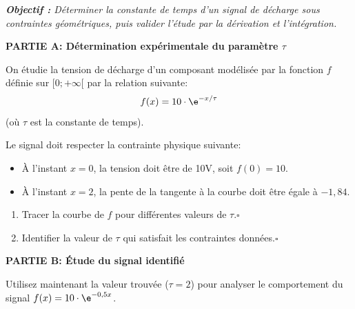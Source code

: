 \documentclass[a4paper,10pt]{report}
\begin{document}
\renewcommand{\labelitemi}{\textbullet}

\pagestyle{DS_FP}
\NomPrenomNote{}


\bigskip

\emph{\textbf{Objectif :} Déterminer la constante de temps d'un signal de décharge sous contraintes géométriques, puis valider l'étude par la dérivation et l'intégration.}

\medskip

\textbf{PARTIE A: Détermination expérimentale du paramètre $\tau$}


\medskip

On étudie la tension de décharge d'un composant modélisée par la fonction $f$ définie sur $[0; +\infty[$ par la relation suivante:
\[f(x) = 10\cdot \e^{-x/\tau}\] (où $\tau$ est la constante de temps).
\medskip

Le signal doit respecter la contrainte physique suivante:

\begin{itemize}
    \item À l'instant $x=0$, la tension doit être de 10V, soit $f(0) = 10$.
    \item À l'instant $x=2$, la pente de la tangente à la courbe doit être égale à $-1,84$.
\end{itemize}

\begin{enumerate}
    \item Tracer la courbe de $f$ pour différentes valeurs de $\tau$.\hfill $\square$
    \item Identifier la valeur de $\tau$ qui satisfait les contraintes données.\hfill $\square$
\end{enumerate}

\bigskip

\textbf{PARTIE B: Étude du signal identifié}

\medskip
Utilisez maintenant la valeur trouvée ($\tau = 2$) pour analyser le comportement du signal $f(x) = 10\cdot \e^{-0,5x}$.
\end{document}
